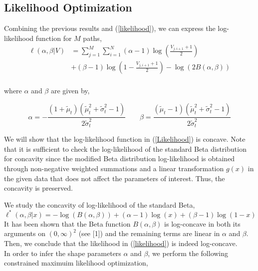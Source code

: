 \documentclass[10pt,twocolumn,letterpaper]{article}
\begin{document}
\subsection{ Likelihood Optimization }

Combining the previous results and (\ref{likelihood}), we can express the log-likelihood function for $M$ paths,
\begin{equation}
\begin{split}
\ell(\alpha, \beta|V)&= \sum\limits_{j=1}^M \sum\limits_{i=1}^N (\alpha -1)\log \left(\frac{V_{j,i+1}+1}{2}\right)\\
& + (\beta -1) \log \left( 1-\frac{V_{j,i+1}+1}{2}\right) - \log \left( 2 B(\alpha, \beta)\right)\\ \label{Likelihood}
\end{split}
\end{equation} 

where $\alpha$ and $\beta$ are given by,

\begin{equation}
\alpha = - \frac{(1+\tilde{\mu}_t )(\tilde{\mu}_t^2 + \tilde{\sigma}_t^2 -1)}{2 \tilde{\sigma}_t^2} \quad \quad \beta =  \frac{(\tilde{\mu}_t-1 )(\tilde{\mu}_t^2 + \tilde{\sigma}_t^2 -1)}{2 \tilde{\sigma}_t^2} \label{param_transformed_beta}
\end{equation}

We will show that the log-likelihood function in (\ref{Likelihood}) is concave. Note that it is sufficient to check the log-likelihood of the standard Beta distribution for concavity since the modified Beta distribution log-likelihood is obtained through non-negative weighted summations and a linear transformation $g(x)$ in the given data that does not affect the parameters of interest. Thus, the concavity is preserved. 

We study the concavity of  log-likelihood of the standard Beta,
\begin{equation*}
\ell^*(\alpha, \beta |x)=-\log (B(\alpha ,\beta ))+(\alpha -1) \log (x)+(\beta -1) \log (1-x)\end{equation*}
It has been shown that the Beta function $B(\alpha, \beta)$ is log-concave in both its arguments on $(0, \infty)^2$ (see [1]) and the remaining terms are linear in $\alpha$ and $\beta$. Then, we conclude that the likelihood in (\ref{likelihood}) is indeed log-concave.\\

In order to infer the shape parameters $\alpha$ and $\beta$, we perform the following constrained maximuim likelihood optimization, 
\end{document}
